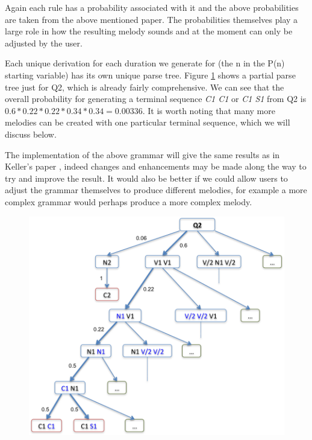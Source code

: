 \documentclass[pdftex,12pt,a4paper]{report}
\begin{document}
Again each rule has a probability associated with it and the above probabilities are taken from the above mentioned paper. The probabilities themselves play a large role in how the resulting melody sounds and at the moment can only be adjusted by the user.

Each unique derivation for each duration we generate for (the n in the P(n) starting variable) has its own unique parse tree. Figure \ref{fig:Q2parsetree} shows a partial parse tree just for Q2, which is already fairly comprehensive. We can see that the overall probability for generating a terminal sequence \emph{C1 C1} or \emph{C1 S1} from Q2 is $0.6*0.22*0.22*0.34*0.34= 0.00336$. It is worth noting that many more melodies can be created with one particular terminal sequence, which we will discuss below.

The implementation of the above grammar will give the same results as in Keller's paper \cite{keller07}, indeed changes and enhancements may be made along the way to try and improve the result. 
It would also be better if we could allow users to adjust the grammar themselves to produce different melodies, for example a more complex grammar would perhaps produce a more complex melody. 

\begin{figure}[here]
  \centering
  \includegraphics[scale=0.8]{figure/Q2parsetree.png}
  \label{fig:Q2parsetree}
\end{figure}
\end{document}
